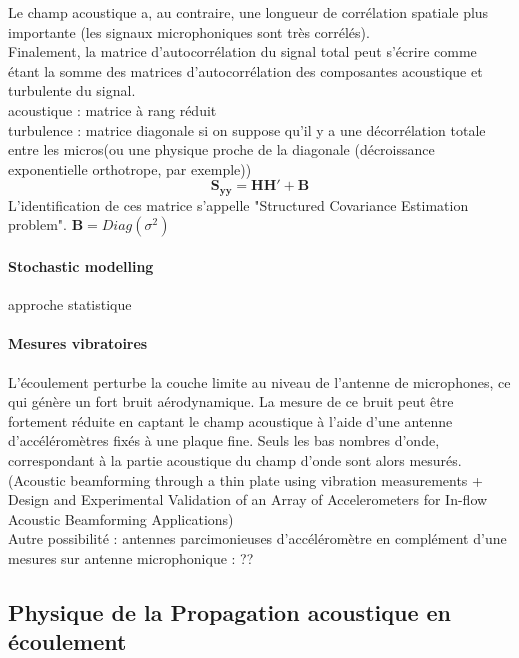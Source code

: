 Le champ acoustique a, au contraire, une longueur de corrélation spatiale plus importante (les signaux microphoniques sont très corrélés).\\

Finalement, la matrice d'autocorrélation du signal total peut s'écrire comme étant la somme des matrices d'autocorrélation des composantes acoustique et turbulente du signal. \\

acoustique : matrice à rang réduit\\
turbulence : matrice diagonale si on suppose qu'il y a une décorrélation totale entre les micros(ou une physique proche de la diagonale (décroissance exponentielle orthotrope, par exemple))\\

\begin{equation}
\bm{S_{yy}} = \bm{HH}' + \bm{B}
\end{equation}
L'identification de ces matrice s'appelle "Structured Covariance Estimation problem".
$\bm{B}=Diag(\sigma^{2})$

\paragraph{Stochastic modelling}
approche statistique


\paragraph{Mesures vibratoires}

L'écoulement perturbe la couche limite au niveau de l'antenne de microphones, ce qui génère un fort bruit aérodynamique. La mesure de ce bruit peut être fortement réduite en captant le champ acoustique à l'aide d'une antenne d'accéléromètres fixés à une plaque fine. Seuls les bas nombres d'onde, correspondant à la partie acoustique du champ d'onde sont alors mesurés. (Acoustic beamforming through a thin plate using vibration measurements  +   Design and Experimental Validation of an Array of Accelerometers for In-flow Acoustic Beamforming Applications) \\


Autre possibilité : antennes parcimonieuses d'accéléromètre en complément d'une mesures sur antenne microphonique : ??





\subsection{Physique de la Propagation acoustique en écoulement}

